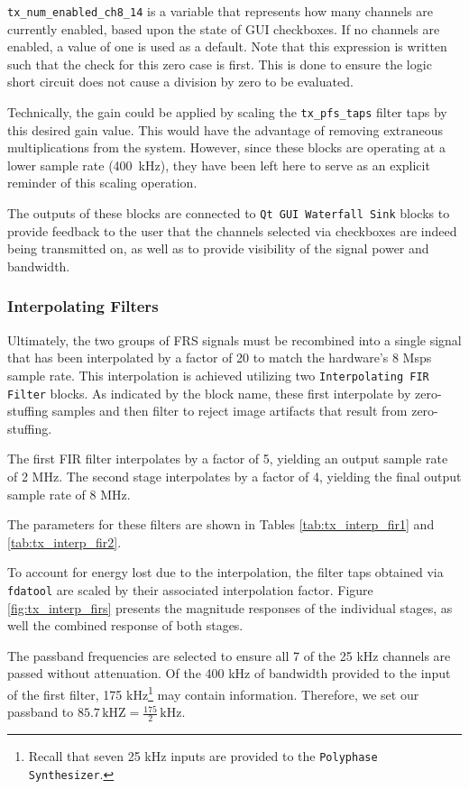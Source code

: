 \texttt{tx\_num\_enabled\_ch8\_14} is a variable that represents how many
channels are currently enabled, based upon the state of GUI checkboxes. If no
channels are enabled, a value of one is used as a default. Note that this
expression is written such that the check for this zero case is first. This is
done to ensure the logic short circuit does not cause a division by zero to be
evaluated.

Technically, the gain could be applied by scaling the \texttt{tx\_pfs\_taps}
filter taps by this desired gain value. This would have the advantage of
removing extraneous multiplications from the system. However, since these
blocks are operating at a lower sample rate (400~kHz), they have been left here
to serve as an explicit reminder of this scaling operation.

The outputs of these blocks are connected to \texttt{Qt GUI Waterfall Sink}
blocks to provide feedback to the user that the channels selected via
checkboxes are indeed being transmitted on, as well as to provide visibility
of the signal power and bandwidth.

\subsubsection{Interpolating Filters}

Ultimately, the two groups of \ac{FRS} signals must be recombined into a single
signal that has been interpolated by a factor of 20 to match the hardware's 8 Msps
sample rate.  This interpolation is achieved utilizing two
\texttt{Interpolating \ac{FIR} Filter} blocks. As indicated by the block name,
these first interpolate by zero-stuffing samples and then filter to reject
image artifacts that result from zero-stuffing.

The first \ac{FIR} filter interpolates by a factor of 5, yielding an output
sample rate of 2 MHz. The second stage interpolates by a factor of 4, yielding
the final output sample rate of 8 MHz.

The parameters for these filters are shown in Tables \ref{tab:tx_interp_fir1}
and \ref{tab:tx_interp_fir2}.

To account for energy lost due to the interpolation, the filter taps obtained
via \texttt{fdatool} are scaled by their associated interpolation factor. Figure
\ref{fig:tx_interp_firs} presents the magnitude responses of the individual
stages, as well the combined response of both stages.

The passband frequencies are selected to ensure all 7 of the 25 kHz channels
are passed without attenuation. Of the 400 kHz of bandwidth provided to the
input of the first filter, 175 kHz\footnote{Recall that seven 25 kHz inputs
are provided to the \texttt{Polyphase Synthesizer}.} may contain information.
Therefore, we set our passband to $85.7 \, \text{kHZ} = \frac{175}{2}
\,\text{kHz}$.

